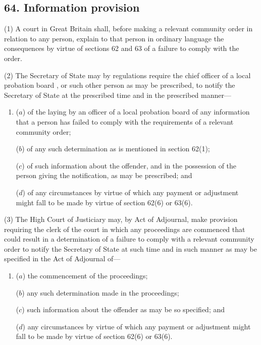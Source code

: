 \documentclass[12pt,a4paper]{article}
\begin{document}

\subsection{64. Information provision}

(1) A court in Great Britain shall, before making a relevant community order in relation to any person, explain to that person in ordinary language the consequences by virtue of sections 62 and 63 of a failure to comply with the order.

(2) The Secretary of State may by regulations require the 
chief officer of a local probation board%
, or such other person as may be prescribed, to notify the Secretary of State at the prescribed time and in the prescribed manner—
\begin{enumerate}\item[]
($a$) of the laying by 
an officer of a local probation board  %
of any information that a person has failed to comply with the requirements of a relevant community order;

($b$) of any such determination as is mentioned in section 62(1);

($c$) of such information about the offender, and in the possession of the person giving the notification, as may be prescribed; and

($d$) of any circumstances by virtue of which any payment or adjustment might fall to be made by virtue of section 62(6)  or 63(6).
\end{enumerate}

(3) The High Court of Justiciary may, by Act of Adjournal, make provision requiring the clerk of the court in which any proceedings are commenced that could result in a determination of a failure to comply with a relevant community order to notify the Secretary of State at such time and in such manner as may be specified in the Act of Adjournal of—
\begin{enumerate}\item[]
($a$) the commencement of the proceedings;

($b$) any such determination made in the proceedings;

($c$) such information about the offender as may be so specified; and

($d$) any circumstances by virtue of which any payment or adjustment might fall to be made by virtue of section 62(6)  or 63(6).
\end{enumerate}
\end{document}

